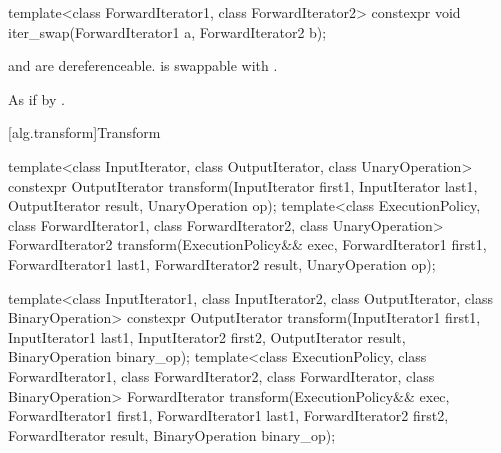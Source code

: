 %
\begin{itemdecl}
template<class ForwardIterator1, class ForwardIterator2>
  constexpr void iter_swap(ForwardIterator1 a, ForwardIterator2 b);
\end{itemdecl}

\begin{itemdescr}
\pnum
\expects
{} and  are dereferenceable.  is
swappable with .

\pnum
\effects
As if by .
\end{itemdescr}

[alg.transform]{Transform}

%
\begin{itemdecl}
template<class InputIterator, class OutputIterator,
         class UnaryOperation>
  constexpr OutputIterator
    transform(InputIterator first1, InputIterator last1,
              OutputIterator result, UnaryOperation op);
template<class ExecutionPolicy, class ForwardIterator1, class ForwardIterator2,
         class UnaryOperation>
  ForwardIterator2
    transform(ExecutionPolicy&& exec,
              ForwardIterator1 first1, ForwardIterator1 last1,
              ForwardIterator2 result, UnaryOperation op);

template<class InputIterator1, class InputIterator2,
         class OutputIterator, class BinaryOperation>
  constexpr OutputIterator
    transform(InputIterator1 first1, InputIterator1 last1,
              InputIterator2 first2, OutputIterator result,
              BinaryOperation binary_op);
template<class ExecutionPolicy, class ForwardIterator1, class ForwardIterator2,
         class ForwardIterator, class BinaryOperation>
  ForwardIterator
    transform(ExecutionPolicy&& exec,
              ForwardIterator1 first1, ForwardIterator1 last1,
              ForwardIterator2 first2, ForwardIterator result,
              BinaryOperation binary_op);


\end{itemdecl}
